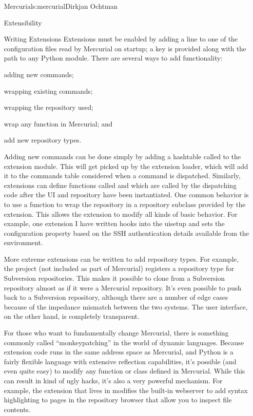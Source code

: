\begin{aosachapter}{Mercurial}{s:mercurial}{Dirkjan Ochtman}
\begin{aosasect1}{Extensibility}
\begin{aosasect2}{Writing Extensions}
Extensions must be enabled by adding a line to one of the
configuration files read by Mercurial on startup; a key is provided
along with the path to any Python module. There are several ways to
add functionality:

\begin{aosaitemize}

  \item adding new commands;

  \item wrapping existing commands;

  \item wrapping the repository used;

  \item wrap any function in Mercurial; and

  \item add new repository types.

\end{aosaitemize}

Adding new commands can be done simply by adding a hashtable called
 to the extension module. This will get picked up by
the extension loader, which will add it to the commands table
considered when a command is dispatched. Similarly, extensions can
define functions called  and  which are
called by the dispatching code after the UI and repository have been
instantiated. One common behavior is to use a 
function to wrap the repository in a repository subclass provided by
the extension. This allows the extension to modify all kinds of basic
behavior. For example, one extension I have written hooks into the
uisetup and sets the  configuration property based on the
SSH authentication details available from the environment.

More extreme extensions can be written to add repository types. For
example, the  project (not included as part of
Mercurial) registers a repository type for Subversion
repositories. This makes it possible to clone from a Subversion
repository almost as if it were a Mercurial repository. It's even
possible to push back to a Subversion repository, although there are a
number of edge cases because of the impedance mismatch between the two
systems. The user interface, on the other hand, is completely
transparent.

For those who want to fundamentally change Mercurial, there is
something commonly called ``monkeypatching'' in the world of dynamic
languages. Because extension code runs in the same address space as
Mercurial, and Python is a fairly flexible language with extensive
reflection capabilities, it's possible (and even quite easy) to modify
any function or class defined in Mercurial. While this can result in
kind of ugly hacks, it's also a very powerful mechanism. For example,
the  extension that lives in  modifies the
built-in webserver to add syntax highlighting to pages in the
repository browser that allow you to inspect file contents.


\end{aosasect2}
\end{aosasect1}
\end{aosachapter}
